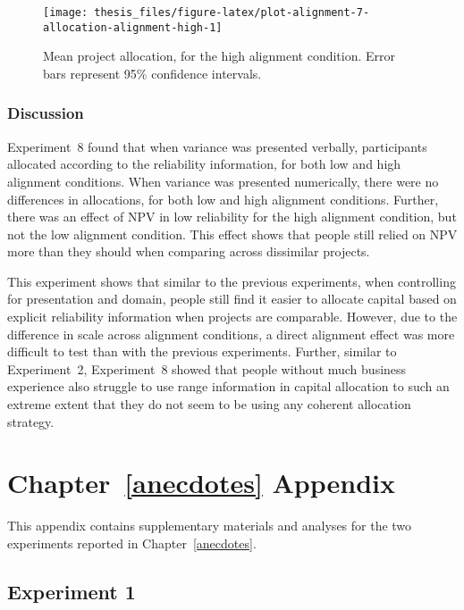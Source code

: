 \documentclass[a4paper, nobind]{templates/ociamthesis}
\theoremstyle{definition}
\theoremstyle{definition}
\theoremstyle{definition}
\theoremstyle{definition}
\theoremstyle{remark}
\begin{document}
\begin{figure}
\texttt{[image: thesis\_files/figure-latex/plot-alignment-7-allocation-alignment-high-1]} \caption{Mean project allocation, for the high alignment condition. Error bars represent 95\% confidence intervals.}\label{fig:plot-alignment-7-allocation-alignment-high}
\end{figure}

\subsection{Discussion}

Experiment~8 found that when variance was presented verbally, participants
allocated according to the reliability information, for both low and high
alignment conditions. When variance was presented numerically, there were no
differences in allocations, for both low and high alignment conditions. Further,
there was an effect of NPV in low reliability for the high alignment condition,
but not the low alignment condition. This effect shows that people still relied
on NPV more than they should when comparing across dissimilar projects.

This experiment shows that similar to the previous experiments, when controlling
for presentation and domain, people still find it easier to allocate capital
based on explicit reliability information when projects are comparable. However,
due to the difference in scale across alignment conditions, a direct alignment
effect was more difficult to test than with the previous experiments. Further,
similar to Experiment~2, Experiment~8 showed that people without much business
experience also struggle to use range information in capital allocation to such
an extreme extent that they do not seem to be using any coherent allocation
strategy.

\hypertarget{anecdotes-appendix}{%
\chapter{Chapter~\ref{anecdotes} Appendix}\label{anecdotes-appendix}}

\minitoc

This appendix contains supplementary materials and analyses for the two
experiments reported in Chapter~\ref{anecdotes}.

\hypertarget{anecdotes-1-appendix}{%
\section{Experiment 1}\label{anecdotes-1-appendix}}
\end{document}
